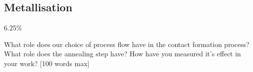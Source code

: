 \subsection{Metallisation}
\label{sec:fab:metallisation}

6.25\%

What role does our choice of process flow have in the contact formation process? What role does the annealing step have? How have you measured it’s effect in your work? [100 words max]
